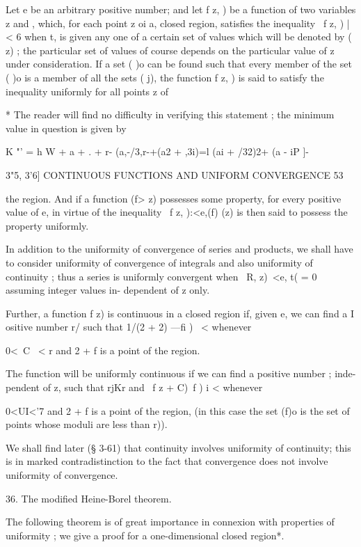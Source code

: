 Let e be an arbitrary positive number; and let f z,  ) be a function of 
two variables z and  , which, for each point z oi a, closed region, satisfies the 
inequality \ f z,  ) | < 6 when t, is given any one of a certain set of values 
which will be denoted by (  z) ; the particular set of values of course depends 
on the particular value of z under consideration. If a set ( )o can be found 
such that every member of the set ( )o is a member of all the sets ( j), the 
function f z,  ) is said to satisfy the inequality uniformly for all points z of 

* The reader will find no difficulty in verifying this statement ; the minimum value in 
question is given by 

K "' = h W + a  +  .  +  r-  (a,-/3,r-+(a2 + ,3i)=l   (ai + /32)2+ (a  - iP  ]- 



3"5, 3'6] CONTINUOUS FUNCTIONS AND UNIFORM CONVERGENCE 53 

the region. And if a function (f>  z) possesses some property, for every positive 
value of e, in virtue of the inequality \ f z, ):<e,(f) (z) is then said to possess 
the property uniformly. 

In addition to the uniformity of convergence of series and products, we shall have 
to consider uniformity of convergence of integrals and also uniformity of continuity ; thus 
a series is uniformly convergent when \ R,  z)\ <e, t( =  0 assuming integer values in- 
dependent of z only. 

Further, a function f z) is continuous in a closed region if, given e, we can find a 
I ositive number r/  such that 1/(2 +  2) —fi ) \ <   whenever 

0<\ C \ < r   
and 2 + f is a point of the region. 

The function will be uniformly continuous if we can find a positive number  ; inde- 
pendent of z, such that rjKr   and \ f z + C)~f  ) i <  whenever 

0<UI<'7 
and 2 + f is a point of the region, (in this case the set (f)o is the set of points whose 
moduli are less than r)). 

We shall find later (§ 3-61) that continuity involves uniformity of continuity; this is 
in marked contradistinction to the fact that convergence does not involve uniformity 
of convergence. 

36. The modified Heine-Borel theorem. 

The following theorem is of great importance in connexion with properties 
of uniformity ; we give a proof for a one-dimensional closed region*. 

